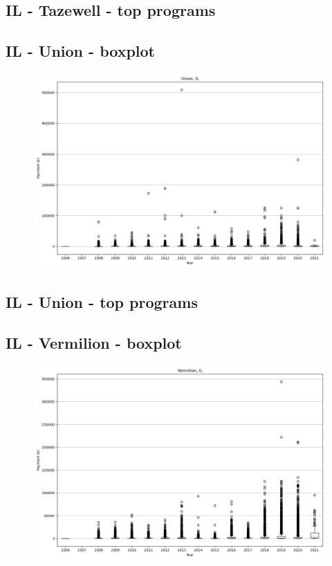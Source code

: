 \subsection*{IL - Tazewell - top programs}

\newpage
\subsection*{IL - Union - boxplot}
\begin{figure}[h]
\centering
\includegraphics[width=7in]{../output/boxplots/counties/Union-IL_boxplot.png}
\end{figure}


\subsection*{IL - Union - top programs}

\newpage
\subsection*{IL - Vermilion - boxplot}
\begin{figure}[h]
\centering
\includegraphics[width=7in]{../output/boxplots/counties/Vermilion-IL_boxplot.png}
\end{figure}


